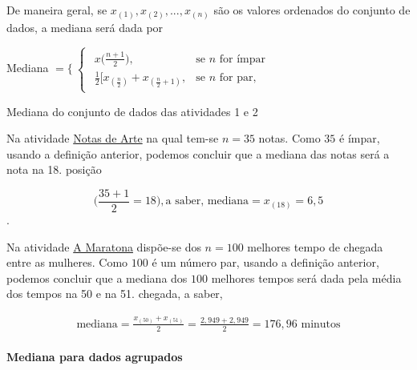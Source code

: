 De maneira geral, se \(x_{(1)},x_{(2)},...,x_{(n)}\) são os valores ordenados do conjunto de dados, a mediana será dada por

Mediana $=\{\
\begin{cases}
\begin{array}{ll}
x\big(\frac{n+1}{2}\big), &\text{se $n$ for ímpar}\\
\frac{1}{2}\big[x_{(\frac{n}{2})}+x_{(\frac{n}{2}+1)}, &\text{se $n$ for par},
\end{array}
\end{cases}
$


\begin{example}{Mediana do conjunto de dados das atividades 1 e 2}

Na atividade \hyperref[\detokenize{PE104-0:ativ-notas-de-artes}]{Notas de Arte} na qual tem-se \(n=35\) notas. Como $35$ é ímpar, usando a definição anterior, podemos concluir que a mediana das notas será a nota na 18. posição

\begin{equation*}
\bigg(\frac{35+1}{2}=18\bigg), \text{a saber, mediana}=x_{(18)}=6{,}5
\end{equation*}.

Na atividade \hyperref[\detokenize{PE104-0:ativ-maratona-de-ny}]{A Maratona} dispõe-se dos \(n=100\) melhores tempo de chegada entre as mulheres. Como $100$ é um número par, usando a definição anterior, podemos concluir que a mediana dos $100$ melhores tempos será dada pela média dos tempos na 50 e na 51. chegada, a saber,


\begin{equation*}
\begin{split}\text{mediana}=\frac{x_{(50)}+x_{(51)}}{2}=\frac{2,949+2,949}{2}=176,96 \text{ minutos}\end{split}
\end{equation*}
\end{example}

\paragraph{Mediana  para dados agrupados}

